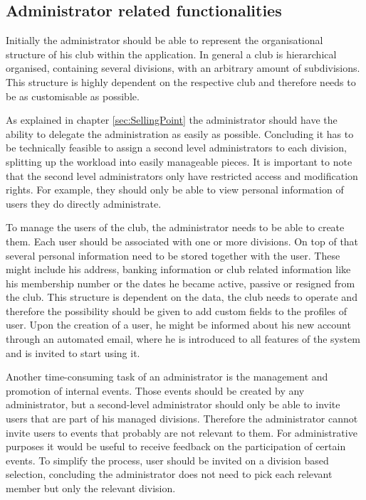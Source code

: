 \subsection{Administrator related functionalities}

Initially the administrator should be able to represent the organisational structure of his club within the application. In general a club is hierarchical organised, containing several divisions, with an arbitrary amount of subdivisions. This structure is highly dependent on the respective club and therefore needs to be as customisable as possible. 

As explained in chapter \vref{sec:SellingPoint} the administrator should have the ability to delegate the administration as easily as possible. Concluding it has to be technically feasible to assign a second level administrators to each division, splitting up the workload into easily manageable pieces. It is important to note that the second level administrators only have restricted access and modification rights. For example, they should only be able to view personal information of users they do directly administrate.

To manage the users of the club, the administrator needs to be able to create them. Each user should be associated with one or more divisions. On top of that several personal information need to be stored together with the user. These might include his address, banking information or club related information like his membership number or the dates he became active, passive or resigned from the club. This structure is dependent on the data, the club needs to operate and therefore the possibility should be given to add custom fields to the profiles of user. Upon the creation of a user, he might be informed about his new account through an automated email, where he is introduced to all features of the system and is invited to start using it.

Another time-consuming task of an administrator is the management and promotion of internal events. Those events should be created by any administrator, but a second-level administrator should only be able to invite users that are part of his managed divisions. Therefore the administrator cannot invite users to events that probably are not relevant to them. For administrative purposes it would be useful to receive feedback on the participation of certain events. To simplify the process, user should be invited on a division based selection, concluding the administrator does not need to pick each relevant member but only the relevant division.

